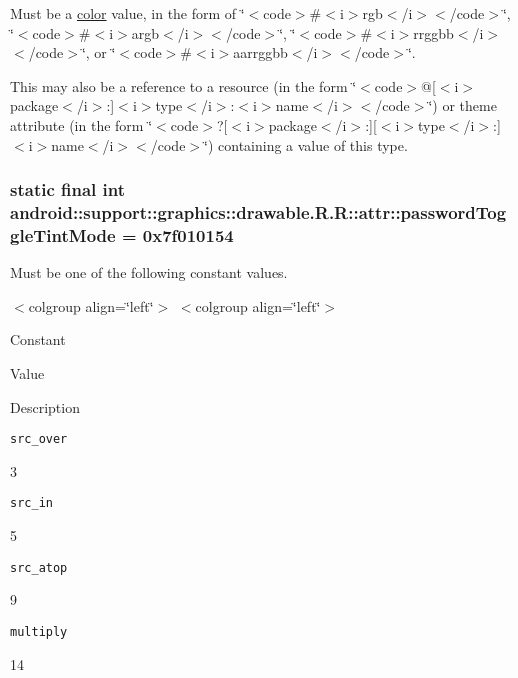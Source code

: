 Must be a \hyperlink{classandroid_1_1support_1_1graphics_1_1drawable_1_1_r_1_1color}{color} value, in the form of \char`\"{}$<$code$>$\#$<$i$>$rgb$<$/i$>$$<$/code$>$\char`\"{}, \char`\"{}$<$code$>$\#$<$i$>$argb$<$/i$>$$<$/code$>$\char`\"{}, \char`\"{}$<$code$>$\#$<$i$>$rrggbb$<$/i$>$$<$/code$>$\char`\"{}, or \char`\"{}$<$code$>$\#$<$i$>$aarrggbb$<$/i$>$$<$/code$>$\char`\"{}. 

This may also be a reference to a resource (in the form \char`\"{}$<$code$>$@\mbox{[}$<$i$>$package$<$/i$>$:\mbox{]}$<$i$>$type$<$/i$>$:$<$i$>$name$<$/i$>$$<$/code$>$\char`\"{}) or theme attribute (in the form \char`\"{}$<$code$>$?\mbox{[}$<$i$>$package$<$/i$>$:\mbox{]}\mbox{[}$<$i$>$type$<$/i$>$:\mbox{]}$<$i$>$name$<$/i$>$$<$/code$>$\char`\"{}) containing a value of this type. \hypertarget{classandroid_1_1support_1_1graphics_1_1drawable_1_1_r_1_1attr_1188a12447e4d3cc83a7930a96d53554}{
\subsubsection[{passwordToggleTintMode}]{\setlength{\rightskip}{0pt plus 5cm}static final int android::support::graphics::drawable.R.R::attr::passwordToggleTintMode = 0x7f010154}}
\label{classandroid_1_1support_1_1graphics_1_1drawable_1_1_r_1_1attr_1188a12447e4d3cc83a7930a96d53554}


Must be one of the following constant values. \begin{TabularC}{0}
\hline
\end{TabularC}
$<$colgroup align=\char`\"{}left\char`\"{}$>$ $<$colgroup align=\char`\"{}left\char`\"{}$>$ 

Constant

Value

Description 

{\tt src\_\-over}

3

{\tt src\_\-in}

5

{\tt src\_\-atop}

9

{\tt multiply}

14

